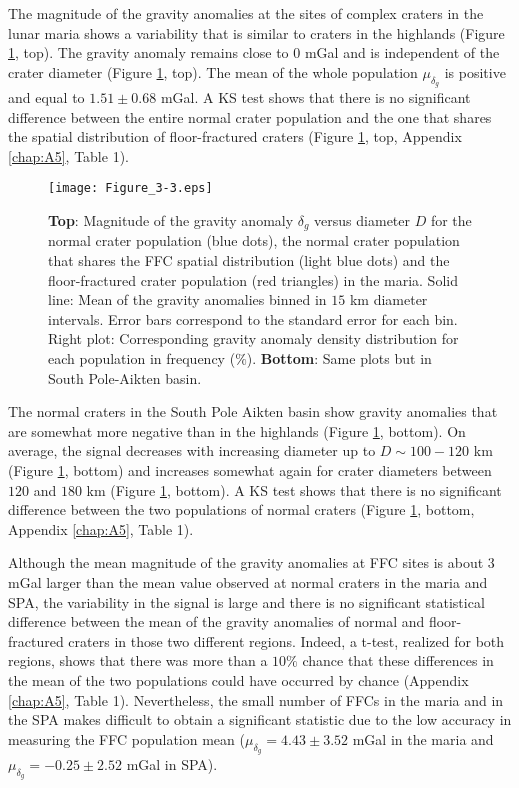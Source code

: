 The magnitude of the gravity anomalies at the sites of complex craters
in the lunar  maria shows a variability that is  similar to craters in
the  highlands (Figure  \ref{Figure3-3},  top).   The gravity  anomaly
remains close  to $0$ mGal and  is independent of the  crater diameter
(Figure  \ref{Figure3-3},  top).  The  mean  of  the whole  population
$\mu_{\delta_g}$ is positive and equal to  $1.51 \pm 0.68$ mGal.  A KS
test shows that there is  no significant difference between the entire
normal  crater  population  and  the   one  that  shares  the  spatial
distribution of floor-fractured  craters (Figure \ref{Figure3-3}, top,
Appendix \ref{chap:A5}, Table 1).
\begin{figure}[h!]
  \graphicspath{ {/Users/thorey/Documents/These/Projet/FFC/Gravi_GRAIL/Article/Papier/SOUMISSION_2_EPSL/} }
  \begin{center}
    \texttt{[image: Figure\_3-3.eps]}
    \caption{\textbf{Top}: Magnitude of the gravity anomaly $\delta_g$
      versus  diameter  $D$ for  the  normal  crater population  (blue
      dots), the normal crater population  that shares the FFC spatial
      distribution (light  blue dots)  and the  floor-fractured crater
      population (red triangles) in the maria. Solid line: Mean of the
      gravity anomalies  binned in $15$ km  diameter intervals.  Error
      bars correspond to the standard error for each bin.  Right plot:
      Corresponding  gravity  anomaly  density distribution  for  each
      population in frequency ($\%$).  \textbf{Bottom}: Same plots but
      in South Pole-Aikten basin.}
    \label{Figure3-3}
  \end{center}
\end{figure}

The  normal  craters in  the  South  Pole  Aikten basin  show  gravity
anomalies  that  are somewhat  more  negative  than in  the  highlands
(Figure \ref{Figure3-3},  bottom).  On  average, the  signal decreases
with  increasing   diameter  up  to   $D  \sim  100-120$   km  (Figure
\ref{Figure3-3},  bottom)  and  increases somewhat  again  for  crater
diameters between $120$ and $180$ km (Figure \ref{Figure3-3}, bottom).
A KS  test shows that there  is no significant difference  between the
two  populations of  normal craters  (Figure \ref{Figure3-3},  bottom,
Appendix \ref{chap:A5}, Table 1).

Although the mean  magnitude of the gravity anomalies at  FFC sites is
about $3$ mGal  larger than the mean value observed  at normal craters
in the maria and SPA, the variability in the signal is large and there
is  no significant  statistical  difference between  the  mean of  the
gravity anomalies of  normal and floor-fractured craters  in those two
different regions.  Indeed, a t-test, realized for both regions, shows
that there was more than a $10\%$ chance that these differences in the
mean of  the two populations  could have occurred by  chance (Appendix
\ref{chap:A5}, Table  1).  Nevertheless, the  small number of  FFCs in
the  maria and  in the  SPA makes  difficult to  obtain a  significant
statistic due to the low accuracy in measuring the FFC population mean
($\mu_{\delta_g}   =4.43  \pm   3.52   $  mGal   in   the  maria   and
$\mu_{\delta_g} =-0.25\pm 2.52 $ mGal in SPA).

